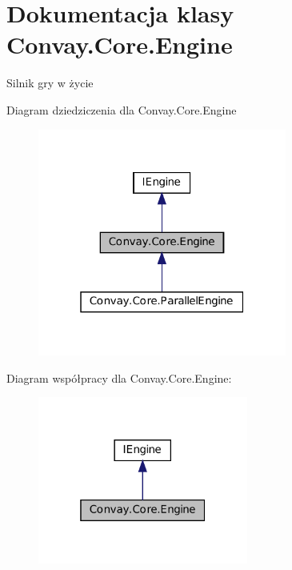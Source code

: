 \hypertarget{class_convay_1_1_core_1_1_engine}{}\section{Dokumentacja klasy Convay.\+Core.\+Engine}
\label{class_convay_1_1_core_1_1_engine}


Silnik gry w życie  




Diagram dziedziczenia dla Convay.\+Core.\+Engine
\nopagebreak
\begin{figure}[H]
\begin{center}
\leavevmode
\includegraphics[width=232pt]{class_convay_1_1_core_1_1_engine__inherit__graph}
\end{center}
\end{figure}


Diagram współpracy dla Convay.\+Core.\+Engine\+:
\nopagebreak
\begin{figure}[H]
\begin{center}
\leavevmode
\includegraphics[width=196pt]{class_convay_1_1_core_1_1_engine__coll__graph}
\end{center}
\end{figure}

